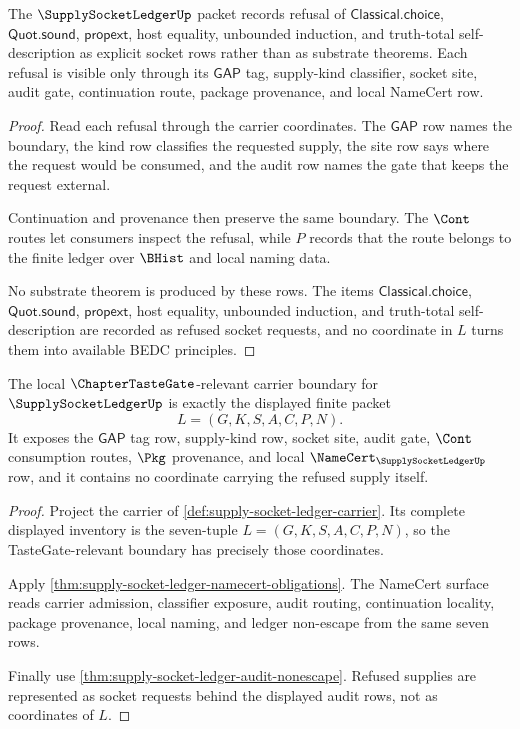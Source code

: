 \begin{theorem}
\label{thm:supply-socket-ledger-audit-nonescape}
The $\SupplySocketLedgerUp$ packet records refusal of $\mathsf{Classical.choice}$, $\mathsf{Quot.sound}$, $\mathsf{propext}$, host equality, unbounded induction, and truth-total self-description as explicit socket rows rather than as substrate theorems. Each refusal is visible only through its $\mathsf{GAP}$ tag, supply-kind classifier, socket site, audit gate, continuation route, package provenance, and local NameCert row.
\end{theorem}
\begin{proof}
Read each refusal through the carrier coordinates. The $\mathsf{GAP}$ row names the boundary, the kind row classifies the requested supply, the site row says where the request would be consumed, and the audit row names the gate that keeps the request external.

Continuation and provenance then preserve the same boundary. The $\Cont$ routes let consumers inspect the refusal, while $P$ records that the route belongs to the finite ledger over $\BHist$ and local naming data.

No substrate theorem is produced by these rows. The items $\mathsf{Classical.choice}$, $\mathsf{Quot.sound}$, $\mathsf{propext}$, host equality, unbounded induction, and truth-total self-description are recorded as refused socket requests, and no coordinate in $L$ turns them into available BEDC principles.
\end{proof}

\begin{theorem}
\label{thm:supply-socket-ledger-tastegate-carrier-boundary}
The local $\ChapterTasteGate$-relevant carrier boundary for $\SupplySocketLedgerUp$ is exactly the displayed finite packet
$$
L=(G,K,S,A,C,P,N).
$$
It exposes the $\mathsf{GAP}$ tag row, supply-kind row, socket site, audit gate, $\Cont$ consumption routes, $\Pkg$ provenance, and local $\NameCert_{\SupplySocketLedgerUp}$ row, and it contains no coordinate carrying the refused supply itself.
\end{theorem}
\begin{proof}
Project the carrier of \autoref{def:supply-socket-ledger-carrier}. Its complete displayed inventory is the seven-tuple $L=(G,K,S,A,C,P,N)$, so the TasteGate-relevant boundary has precisely those coordinates.

Apply \autoref{thm:supply-socket-ledger-namecert-obligations}. The NameCert surface reads carrier admission, classifier exposure, audit routing, continuation locality, package provenance, local naming, and ledger non-escape from the same seven rows.

Finally use \autoref{thm:supply-socket-ledger-audit-nonescape}. Refused supplies are represented as socket requests behind the displayed audit rows, not as coordinates of $L$.
\end{proof}

